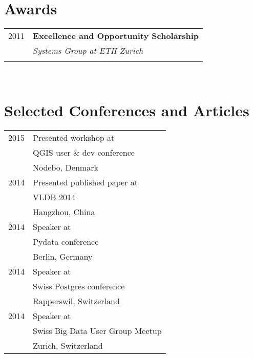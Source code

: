 \documentclass[10pt]{article} %
\begin{document}
\begin{minipage}[t]{0.44\textwidth}
\begin{tabular}{ll}
\end{tabular}




\section{Awards} 

\begin{tabular}{rl}
2011	 & \textbf{Excellence and Opportunity Scholarship}\\
& \textit{Systems Group at ETH Zurich}\\ \\

\end{tabular}\\[10pt]




\section{Selected Conferences and Articles} 

\begin{tabular}{rl}
\textsc{2015}
& Presented workshop at \\
& QGIS user \& dev conference \\
& \small Nodebo, Denmark \\
\textsc{2014}
& Presented published paper at \\
& VLDB 2014 \\
& \small Hangzhou, China \\
\textsc{2014}
& Speaker at \\
& Pydata conference \\
& \small Berlin, Germany \\
\textsc{2014}
& Speaker at \\
& Swiss Postgres conference \\
& \small Rapperswil, Switzerland \\
\textsc{2014}
& Speaker at \\
& Swiss Big Data User Group Meetup \\
& \small Zurich, Switzerland \\



\end{tabular}
\end{minipage}
\end{document}
